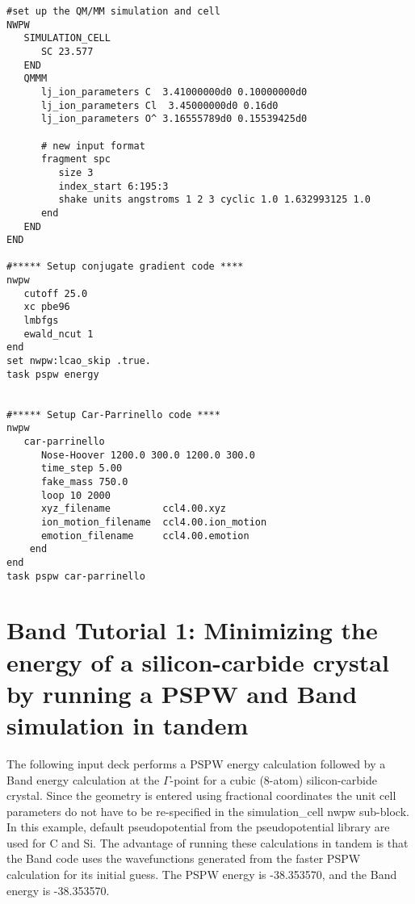 \begin{verbatim}
#set up the QM/MM simulation and cell
NWPW
   SIMULATION_CELL
      SC 23.577
   END
   QMMM
      lj_ion_parameters C  3.41000000d0 0.10000000d0
      lj_ion_parameters Cl  3.45000000d0 0.16d0
      lj_ion_parameters O^ 3.16555789d0 0.15539425d0

      # new input format
      fragment spc
         size 3
         index_start 6:195:3
         shake units angstroms 1 2 3 cyclic 1.0 1.632993125 1.0
      end
   END
END

#***** Setup conjugate gradient code ****
nwpw
   cutoff 25.0
   xc pbe96
   lmbfgs
   ewald_ncut 1
end
set nwpw:lcao_skip .true.
task pspw energy


#***** Setup Car-Parrinello code ****
nwpw
   car-parrinello
      Nose-Hoover 1200.0 300.0 1200.0 300.0
      time_step 5.00
      fake_mass 750.0
      loop 10 2000
      xyz_filename         ccl4.00.xyz
      ion_motion_filename  ccl4.00.ion_motion
      emotion_filename     ccl4.00.emotion
    end
end
task pspw car-parrinello

\end{verbatim}




\normalsize
\section{Band Tutorial 1: Minimizing the energy of a silicon-carbide crystal by running a PSPW and Band simulation in tandem}
\label{sec:band_tutorial1}
\normalsize

The following input deck performs a PSPW energy calculation followed
by a Band energy calculation at the $\Gamma$-point  for a cubic (8-atom) 
silicon-carbide crystal.  Since the geometry is entered using fractional coordinates
the unit cell parameters do not have to be re-specified in the simulation\_cell
nwpw sub-block.  In this example, default pseudopotential from the pseudopotential
library are used for C and Si.  The advantage of running these calculations in tandem is that
the Band code uses the wavefunctions generated from the faster PSPW calculation for
its initial guess.  The PSPW energy is -38.353570, and the Band energy is -38.353570.
 
